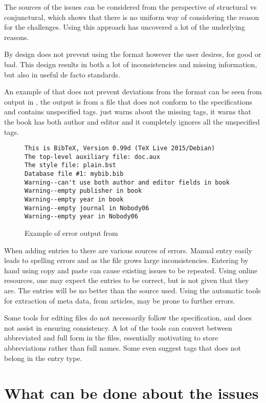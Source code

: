 The sources of the issues can be considered from the perspective of
structural vs conjunctural, which shows that there is no uniform way
of considering the reason for the challenges.  Using this approach has
uncovered a lot of the underlying reasons.

By design {\bibtex} does not prevent using the format however the user
desires, for good or bad.  This design results in both a lot of
inconsistencies and missing information, but also in useful de facto
standards.

An example of that {\bibtex} does not prevent deviations from the
format can be seen from output in , the output
is from a file that does not conform to the specifications and
contains unspecified tags.  {\bibtex} just warns about the missing
tags, it warns that the book has both author and editor and it
completely ignores all the unspecified tags.

\begin{figure}
  \centering
  \begin{verbatim}
This is BibTeX, Version 0.99d (TeX Live 2015/Debian)
The top-level auxiliary file: doc.aux
The style file: plain.bst
Database file #1: mybib.bib
Warning--can't use both author and editor fields in book
Warning--empty publisher in book
Warning--empty year in book
Warning--empty journal in Nobody06
Warning--empty year in Nobody06
\end{verbatim}
  \caption{Example of error output from {\bibtex}}
\label{fig:bibtex_out}
\end{figure}

When adding entries to {\bibtex} there are various sources of errors.
Manual entry easily leads to spelling errors and as the file grows
large inconsistencies.  Entering by hand using copy and paste can
cause existing issues to be repeated.  Using online resources, one may
expect the entries to be correct, but is not given that they are.  The
entries will be no better than the source used.  Using the automatic
tools for extraction of meta data, from articles, may be prone to
further errors.

Some tools for editing {\bibtex} files do not necessarily follow the
specification, and does not assist in ensuring consistency.  A lot of
the tools can convert between abbreviated and full form in the files,
essentially motivating to store abbreviations rather than full names.
Some even suggest tags that does not belong in the entry type.


\section{What can be done about the {\bibtex} issues}
\label{sec:intro_what_to_do}

